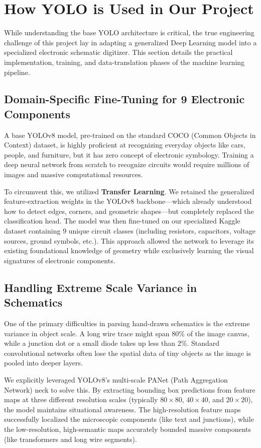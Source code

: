 \chapter{How YOLO is Used in Our Project}

While understanding the base YOLO architecture is critical, the true engineering challenge of this project lay in adapting a generalized Deep Learning model into a specialized electronic schematic digitizer. This section details the practical implementation, training, and data-translation phases of the machine learning pipeline.

\section{Domain-Specific Fine-Tuning for 9 Electronic Components}
A base YOLOv8 model, pre-trained on the standard COCO (Common Objects in Context) dataset, is highly proficient at recognizing everyday objects like cars, people, and furniture, but it has zero concept of electronic symbology. Training a deep neural network from scratch to recognize circuits would require millions of images and massive computational resources.

To circumvent this, we utilized \textbf{Transfer Learning}. We retained the generalized feature-extraction weights in the YOLOv8 backbone—which already understood how to detect edges, corners, and geometric shapes—but completely replaced the classification head. The model was then fine-tuned on our specialized Kaggle dataset containing 9 unique circuit classes (including resistors, capacitors, voltage sources, ground symbols, etc.). This approach allowed the network to leverage its existing foundational knowledge of geometry while exclusively learning the visual signatures of electronic components.

\section{Handling Extreme Scale Variance in Schematics}
One of the primary difficulties in parsing hand-drawn schematics is the extreme variance in object scale. A long wire trace might span $80\%$ of the image canvas, while a junction dot or a small diode takes up less than $2\%$. Standard convolutional networks often lose the spatial data of tiny objects as the image is pooled into deeper layers.

We explicitly leveraged YOLOv8’s multi-scale PANet (Path Aggregation Network) neck to solve this. By extracting bounding box predictions from feature maps at three different resolution scales (typically $80 \times 80$, $40 \times 40$, and $20 \times 20$), the model maintains situational awareness. The high-resolution feature maps successfully localized the microscopic components (like text and junctions), while the low-resolution, high-semantic maps accurately bounded massive components (like transformers and long wire segments).

